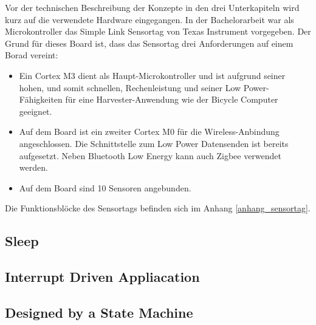{Vor der technischen Beschreibung der Konzepte in den drei Unterkapiteln wird kurz auf die verwendete Hardware eingegangen. In der Bachelorarbeit war als Microkontroller das Simple Link Sensortag von Texas Instrument vorgegeben. Der Grund für dieses Board ist, dass das Sensortag drei Anforderungen auf einem Borad vereint:

\begin{itemize}
    \item Ein Cortex M3 dient als Haupt-Microkontroller und ist aufgrund seiner hohen, und somit schnellen, Rechenleistung und seiner Low Power-Fähigkeiten für eine Harvester-Anwendung wie der Bicycle Computer geeignet.
    \item Auf dem Board ist ein zweiter Cortex M0 für die Wireless-Anbindung angeschlossen. Die Schnittstelle zum Low Power Datensenden ist bereits aufgesetzt. Neben Bluetooth Low Energy kann auch Zigbee verwendet werden.
    \item Auf dem Board sind 10 Sensoren angebunden.
\end{itemize}

Die Funktionsblöcke des Sensortags befinden sich im Anhang \ref{anhang_sensortag}.

\subsection{Sleep}\label{pm_sleep} 


\subsection{Interrupt Driven Appliacation}\label{pm_interrupt} 

\subsection{Designed by a State Machine}\label{pm_state_machine} 

  
%
%

}
